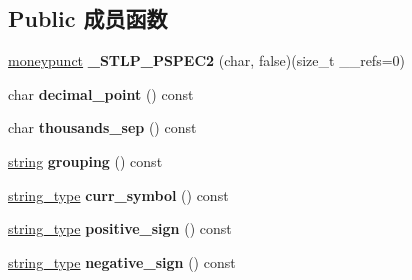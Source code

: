 \subsection*{Public 成员函数}
\begin{DoxyCompactItemize}
\item 
\mbox{\label{classmoneypunct_3_01char_00_01false_01_4_aff4ba36afc842059d511c8968d43c480}} 
\hyperlink{classmoneypunct}{moneypunct} {\bfseries \+\_\+\+S\+T\+L\+P\+\_\+\+P\+S\+P\+E\+C2} (char, false)(size\+\_\+t \+\_\+\+\_\+refs=0)
\item 
\mbox{\label{classmoneypunct_3_01char_00_01false_01_4_aaa1470ad0d37fb9578589c2c83dac067}} 
char {\bfseries decimal\+\_\+point} () const
\item 
\mbox{\label{classmoneypunct_3_01char_00_01false_01_4_ae27c037e55bdb0549a308e1a0675e5e6}} 
char {\bfseries thousands\+\_\+sep} () const
\item 
\mbox{\label{classmoneypunct_3_01char_00_01false_01_4_a74400f2595937c724be36a54dadfb9cf}} 
\hyperlink{structstring}{string} {\bfseries grouping} () const
\item 
\mbox{\label{classmoneypunct_3_01char_00_01false_01_4_a22d9c5197c9c8de7fdb8a06907dbb85c}} 
\hyperlink{structstring}{string\+\_\+type} {\bfseries curr\+\_\+symbol} () const
\item 
\mbox{\label{classmoneypunct_3_01char_00_01false_01_4_a8316a6bb4d3a07f8c34715d6d9a07966}} 
\hyperlink{structstring}{string\+\_\+type} {\bfseries positive\+\_\+sign} () const
\item 
\mbox{\label{classmoneypunct_3_01char_00_01false_01_4_a1b43c9f8f7019588776457aa81149c84}} 
\hyperlink{structstring}{string\+\_\+type} {\bfseries negative\+\_\+sign} () const
\item 
\mbox{\label{classmoneypunct_3_01char_00_01false_01_4_a12ed4239a797528864aa653ba5e036cd}} 

\end{DoxyCompactItemize}
